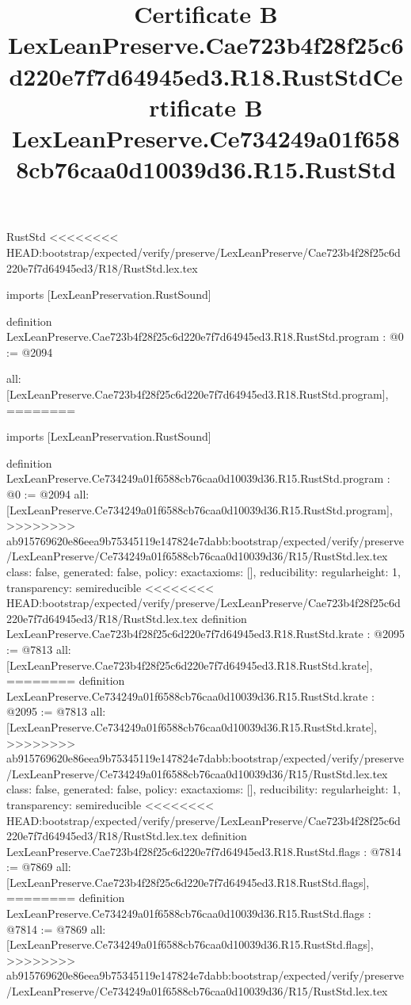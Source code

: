 \begin{lexlean}{RustStd}
<<<<<<<< HEAD:bootstrap/expected/verify/preserve/LexLeanPreserve/Cae723b4f28f25c6d220e7f7d64945ed3/R18/RustStd.lex.tex
\title{Certificate B LexLeanPreserve.Cae723b4f28f25c6d220e7f7d64945ed3.R18.RustStd}
\begin{coremodule}
imports [LexLeanPreservation.RustSound]

definition LexLeanPreserve.Cae723b4f28f25c6d220e7f7d64945ed3.R18.RustStd.program : @0 := @2094 {
  all: [LexLeanPreserve.Cae723b4f28f25c6d220e7f7d64945ed3.R18.RustStd.program],
========
\title{Certificate B LexLeanPreserve.Ce734249a01f6588cb76caa0d10039d36.R15.RustStd}
\begin{coremodule}
imports [LexLeanPreservation.RustSound]

definition LexLeanPreserve.Ce734249a01f6588cb76caa0d10039d36.R15.RustStd.program : @0 := @2094 {
  all: [LexLeanPreserve.Ce734249a01f6588cb76caa0d10039d36.R15.RustStd.program],
>>>>>>>> ab915769620e86eea9b75345119e147824e7dabb:bootstrap/expected/verify/preserve/LexLeanPreserve/Ce734249a01f6588cb76caa0d10039d36/R15/RustStd.lex.tex
  class: false,
  generated: false,
  policy: exact{axioms: []},
  reducibility: regular{height: 1},
  transparency: semireducible
}
<<<<<<<< HEAD:bootstrap/expected/verify/preserve/LexLeanPreserve/Cae723b4f28f25c6d220e7f7d64945ed3/R18/RustStd.lex.tex
definition LexLeanPreserve.Cae723b4f28f25c6d220e7f7d64945ed3.R18.RustStd.krate : @2095 := @7813 {
  all: [LexLeanPreserve.Cae723b4f28f25c6d220e7f7d64945ed3.R18.RustStd.krate],
========
definition LexLeanPreserve.Ce734249a01f6588cb76caa0d10039d36.R15.RustStd.krate : @2095 := @7813 {
  all: [LexLeanPreserve.Ce734249a01f6588cb76caa0d10039d36.R15.RustStd.krate],
>>>>>>>> ab915769620e86eea9b75345119e147824e7dabb:bootstrap/expected/verify/preserve/LexLeanPreserve/Ce734249a01f6588cb76caa0d10039d36/R15/RustStd.lex.tex
  class: false,
  generated: false,
  policy: exact{axioms: []},
  reducibility: regular{height: 1},
  transparency: semireducible
}
<<<<<<<< HEAD:bootstrap/expected/verify/preserve/LexLeanPreserve/Cae723b4f28f25c6d220e7f7d64945ed3/R18/RustStd.lex.tex
definition LexLeanPreserve.Cae723b4f28f25c6d220e7f7d64945ed3.R18.RustStd.flags : @7814 := @7869 {
  all: [LexLeanPreserve.Cae723b4f28f25c6d220e7f7d64945ed3.R18.RustStd.flags],
========
definition LexLeanPreserve.Ce734249a01f6588cb76caa0d10039d36.R15.RustStd.flags : @7814 := @7869 {
  all: [LexLeanPreserve.Ce734249a01f6588cb76caa0d10039d36.R15.RustStd.flags],
>>>>>>>> ab915769620e86eea9b75345119e147824e7dabb:bootstrap/expected/verify/preserve/LexLeanPreserve/Ce734249a01f6588cb76caa0d10039d36/R15/RustStd.lex.tex
}}}
\end{coremodule}}
\end{coremodule}
\end{lexlean}

